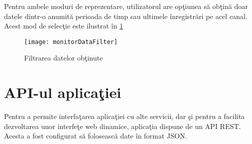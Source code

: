 Pentru ambele moduri de reprezentare, utilizatorul are opţiunea să obţină doar datele dintr-o anumită perioada de timp sau ultimele înregistrări pe acel canal. Acest mod de selecţie este ilustrat în \cref{fig:monitorDataFilter}
\begin{figure}[H]
	\centering
	\texttt{[image: monitorDataFilter]}
	\caption{Filtrarea datelor obţinute}
	\label{fig:monitorDataFilter}
\end{figure}
\section{API-ul aplicaţiei}
Pentru a permite interfaţarea aplicaţiei cu alte servicii, dar şi pentru a facilita dezvoltarea unor interfeţe web dinamice, aplicaţia dispune de un API REST. Acesta a fost configurat să folosească date în format JSON.

